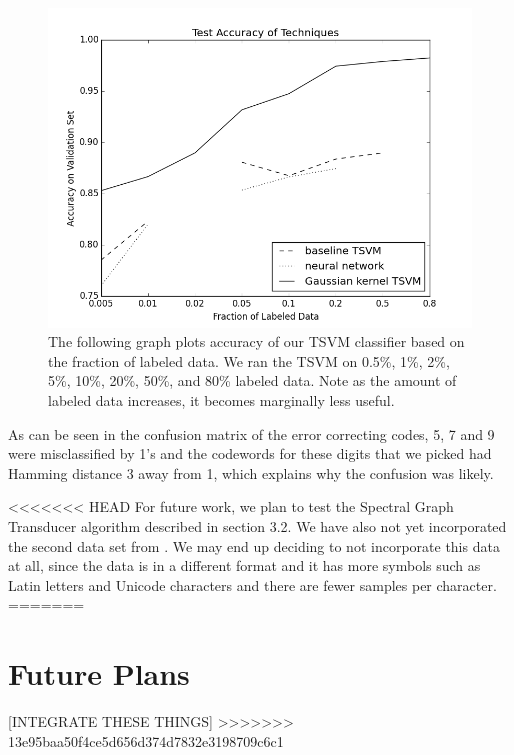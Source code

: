 \documentclass[11pt]{article}
\begin{document}
\begin{figure}
  \centering
  \caption{The following graph plots accuracy of our TSVM classifier based on the fraction of labeled data. We ran the TSVM on 0.5\%, 1\%, 2\%, 5\%, 10\%, 20\%, 50\%, and 80\% labeled data. Note as the amount of labeled data increases, it becomes marginally less useful.}
  \includegraphics[width=5in]{figure_1.png}
\end{figure}


As can be seen in the confusion matrix of the error correcting codes,
5, 7 and 9 were misclassified by 1's and the codewords for
these digits that we picked had Hamming distance 3 away from 1, which
explains why the confusion was likely.

<<<<<<< HEAD
For future work, we plan to test the Spectral Graph Transducer algorithm described in section 3.2. We have also not yet incorporated the second data set from \cite{Llorens:2008}. We may end up deciding to not incorporate this data at all, since the data is in a different format and it has more symbols such as Latin letters and Unicode characters and there are fewer samples per character.
=======
\section{Future Plans}

[INTEGRATE THESE THINGS]
>>>>>>> 13e95baa50f4ce5d656d374d7832e3198709c6c1
\end{document}
